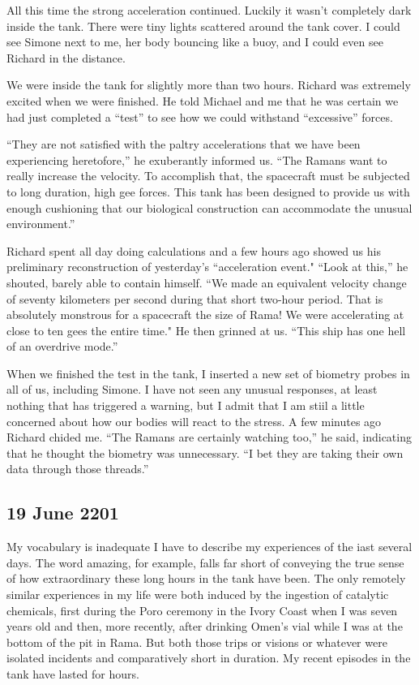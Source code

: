 \documentclass[]{article}
\begin{document}
All this time the strong acceleration continued.  Luckily it wasn’t completely dark inside the tank.  There were tiny lights scattered around the tank cover.  I could see Simone next to me, her body bouncing like a buoy, and I could even see Richard in the distance.

We were inside the tank for slightly more than two hours.  Richard was extremely excited when we were finished.  He told Michael and me that he was certain we had just completed a “test” to see how we could withstand “excessive” forces.

“They are not satisfied with the paltry accelerations that we have been experiencing heretofore,” he exuberantly informed us.  “The Ramans want to really increase the velocity.  To accomplish that, the spacecraft must be subjected to long duration, high gee forces.  This tank has been designed to provide us with enough cushioning that our biological construction can accommodate the unusual environment.”

Richard spent all day doing calculations and a few hours ago showed us his preliminary reconstruction of yesterday’s “acceleration event."  “Look at this,” he shouted, barely able to contain himself.  “We made an equivalent velocity change of seventy kilometers per second during that short two-hour period.  That is absolutely monstrous for a spacecraft the size of Rama! We were accelerating at close to ten gees the entire time."  He then grinned at us.  “This ship has one hell of an overdrive mode.”

When we finished the test in the tank, I inserted a new set of biometry probes in all of us, including Simone.  I have not seen any unusual responses, at least nothing that has triggered a warning, but I admit that I am stiil a little concerned about how our bodies will react to the stress.  A few minutes ago Richard chided me.  “The Ramans are certainly watching too,” he said, indicating that he thought the biometry was unnecessary.  “I bet they are taking their own data through those threads.”

\subsection*{19 June 2201}

My vocabulary is inadequate I have to describe my experiences of the iast several days.  The word amazing, for example, falls far short of conveying the true sense of how extraordinary these long hours in the tank have been.  The only remotely similar experiences in my life were both induced by the ingestion of catalytic chemicals, first during the Poro ceremony in the Ivory Coast when I was seven years old and then, more recently, after drinking Omen’s vial while I was at the bottom of the pit in Rama.  But both those trips or visions or whatever were isolated incidents and comparatively short in duration.  My recent episodes in the tank have lasted for hours.
\end{document}
